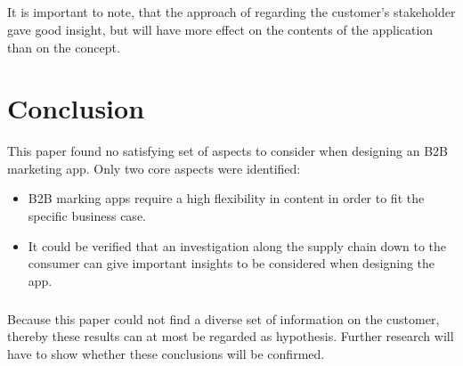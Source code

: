 \paragraph{} It is important to note, that the approach of regarding the customer's stakeholder gave good insight, but will have more effect on the contents of the application than on the concept. 

\chapter{Conclusion}
This paper found no satisfying set of aspects to consider when designing an B2B marketing app. Only two core aspects were identified:

\begin{itemize}
\item B2B marking apps require a high flexibility in content in order to fit the specific business case.
\item It could be verified that an investigation along the supply chain down to the consumer can give important insights to be considered when designing the app.
\end{itemize}

\paragraph{} Because this paper could not find a diverse set of information on the customer, thereby these results can at most be regarded as hypothesis. Further research will have to show whether these conclusions will be confirmed.

\begin{itemize}

\end{itemize}